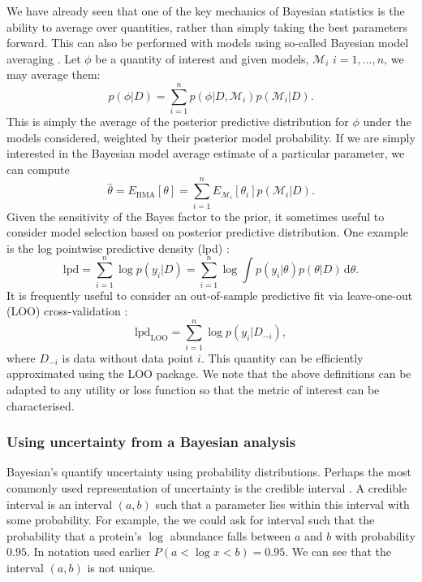 \documentclass[12pt,english]{article}
\begin{document}
We have already seen that one of the key mechanics of Bayesian statistics is the ability to average over quantities, rather than simply taking the best parameters forward. This can also be performed with models using so-called Bayesian model averaging \citep{Raftery::1997}. Let $\phi$ be a quantity of interest and given models, $\mathcal{M}_i$ $i = 1,..., n$, we may average them:
\begin{equation}
p(\phi|D) = \sum_{i = 1}^{n}p(\phi|D, \mathcal{M}_i)p(\mathcal{M}_i|D).
\end{equation}
This is simply the average of the posterior predictive distribution for $\phi$ under the models considered, weighted by their posterior model probability. If we are simply interested in the Bayesian model average estimate of a particular parameter, we can compute
\begin{equation}
\hat{\theta} = E_{\text{BMA}}[\theta] = \sum_{i = 1}^{n}E_{\mathcal{M}_i}[\theta_i] p(\mathcal{M}_i|D).
\end{equation}
Given the sensitivity of the Bayes factor to the prior, it sometimes useful to consider model selection based on posterior predictive distribution. One example is the log pointwise predictive density (lpd) \citep{Vehtari::2017}:
\begin{equation}
\text{lpd} = \sum_{i = 1}^n \log p(y_i|D) = \sum_{i = 1}^n \log \int p(y_i|\theta)p(\theta|D)\, \text{d}\theta.
\end{equation}
It is frequently useful to consider an out-of-sample predictive fit via leave-one-out (LOO) cross-validation \citep{Vehtari::2017}:
\begin{equation}
\text{lpd}_\text{LOO} = \sum_{i = 1}^{n}\log p(y_i| D_{-i}),
\end{equation}
where $D_{-i}$ is data without data point $i$. This quantity can be efficiently approximated using the LOO package. We note that the above definitions can be adapted to any utility or loss function so that the metric of interest can be characterised.


\subsubsection{Using uncertainty from a Bayesian analysis}
Bayesian's quantify uncertainty using probability distributions. Perhaps the most commonly used representation of uncertainty is the credible interval \citep{Gelman::1995}. A credible interval is an interval $(a,b)$ such that a parameter lies within this interval with some probability. For example, the we could ask for interval such that the probability that a protein's $\log$ abundance falls between $a$ and $b$ with probability $0.95$. In notation used earlier $P(a < \log x < b) = 0.95$. We can see that the interval $(a,b)$ is not unique. 
\end{document}

